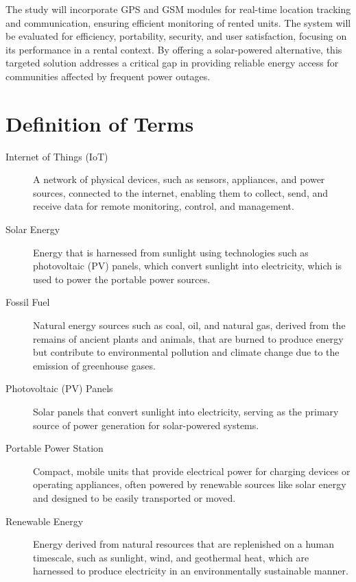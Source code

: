 {The study will incorporate GPS and GSM modules for real-time location tracking and communication, ensuring efficient monitoring of rented units. The system will be evaluated for efficiency, portability, security, and user satisfaction, focusing on its performance in a rental context.	 By offering a solar-powered alternative, this targeted solution addresses a critical gap in providing reliable energy access for communities affected by frequent power outages.

\section{Definition of Terms}

\begin{description}

	\item[Internet of Things (IoT)] 
	A network of physical devices, such as sensors, appliances, and power sources, connected to the internet, enabling them to collect, send, and receive data for remote monitoring, control, and management.
	
	\item[Solar Energy] 
	Energy that is harnessed from sunlight using technologies such as photovoltaic (PV) panels, which convert sunlight into electricity, which is used to power the portable power sources.
	
	\item[Fossil Fuel] 
	Natural energy sources such as coal, oil, and natural gas, derived from the remains of ancient plants and animals, that are burned to produce energy but contribute to environmental pollution and climate change due to the emission of greenhouse gases.
	
	\item[Photovoltaic (PV) Panels] 
	Solar panels that convert sunlight into electricity, serving as the primary source of power generation for solar-powered systems.
	
	\item[Portable Power Station] 
	Compact, mobile units that provide electrical power for charging devices or operating appliances, often powered by renewable sources like solar energy and designed to be easily transported or moved.
	
	\item[Renewable Energy] 
	Energy derived from natural resources that are replenished on a human timescale, such as sunlight, wind, and geothermal heat, which are harnessed to produce electricity in an environmentally sustainable manner.
	

\end{description}}
